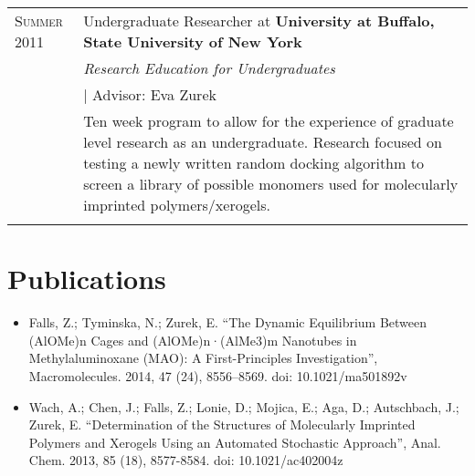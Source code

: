 \documentclass[letterpaper,10pt]{article} %
\begin{document}
\begin{tabular}{R{3cm}|p{13cm}}

\textsc{Summer 2011} & Undergraduate Researcher at \textbf{University at Buffalo, State University of New York} \\
& \emph{Research Education for Undergraduates} \\
& \hspace{3mm} \small | Advisor: Eva Zurek \\ 
& \footnotesize{Ten week program to allow for the experience of graduate level research as an undergraduate. Research focused on testing a newly written random docking algorithm to screen a library of possible monomers used for molecularly imprinted polymers/xerogels.}\\
 \\

\end{tabular}




\section{Publications}
\noindent

\begin{itemize}

    \item Falls, Z.; Tyminska, N.; Zurek, E. “The Dynamic Equilibrium Between (AlOMe)n Cages and (AlOMe)n·(AlMe3)m Nanotubes in Methylaluminoxane (MAO): A First-Principles Investigation”, Macromolecules. 2014, 47 (24), 8556–8569. doi: 10.1021/ma501892v

    \item Wach, A.; Chen, J.; Falls, Z.; Lonie, D.; Mojica, E.; Aga, D.; Autschbach, J.; Zurek, E. “Determination of the Structures of Molecularly Imprinted Polymers and Xerogels Using an Automated Stochastic Approach”, Anal. Chem. 2013, 85 (18), 8577-8584. doi: 10.1021/ac402004z

\end{itemize}



\end{document}
